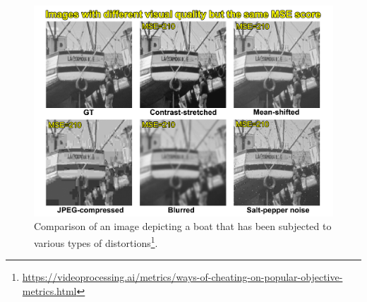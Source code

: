 \begin{figure}[ht]
    \centering
    \includegraphics[width=1.0\textwidth]{figures/psnr-critique.png}
    \caption[PSNR critique]{Comparison of an image depicting a boat that has been subjected to various types of distortions\footnote{\url{https://videoprocessing.ai/metrics/ways-of-cheating-on-popular-objective-metrics.html}}.}
    \label{fig:psnr-critique}
\end{figure}